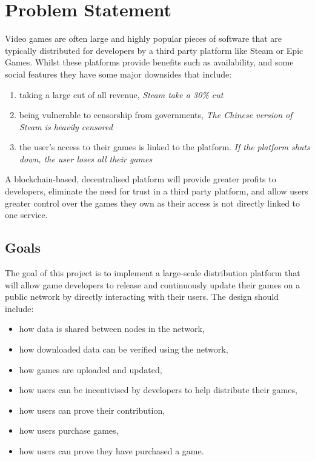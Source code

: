 
\chapter{Problem Statement}

Video games are often large and highly popular pieces of software that are typically distributed for developers by a third party platform like Steam or Epic Games. Whilst these platforms provide benefits such as availability, and some social features they have some major downsides that include:
\vspace{1mm}
\begin{enumerate}[label=(\alph*)]
  \item taking a large cut of all revenue, \newline\textit{Steam take a 30\% cut}
  \item being vulnerable to censorship from governments, \newline\textit{The Chinese version of Steam is heavily censored}
  \item the user's access to their games is linked to the platform. \newline\textit{If the platform shuts down, the user loses all their games}
\end{enumerate}
\vspace{1mm}
\noindent A blockchain-based, decentralised platform will provide greater profits to developers, eliminate the need for trust in a third party platform, and allow users greater control over the games they own as their access is not directly linked to one service.

\section{Goals}

The goal of this project is to implement a large-scale distribution platform that will allow game developers to release and continuously update their games on a public network by directly interacting with their users. The design should include:
\vspace{1mm}
\begin{itemize}
  \item how data is shared between nodes in the network,
  \item how downloaded data can be verified using the network,
  \item how games are uploaded and updated,
  \item how users can be incentivised by developers to help distribute their games,
  \item how users can prove their contribution,
  \item how users purchase games,
  \item how users can prove they have purchased a game.
\end{itemize}
\vspace{1mm}

